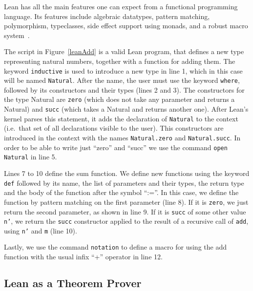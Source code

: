 Lean has all the main features one can expect from a functional programming language. Its features include algebraic datatypes, pattern matching, polymorphism, typeclasses, side effect support using monads, and a robust macro system~\cite{lean4_ref}.

The script in Figure~\ref{leanAdd} is a valid Lean program, that defines a new type representing natural numbers, together with a function for adding them.
The keyword \texttt{inductive} is used to introduce a new type in line 1, which in this case will be named \texttt{Natural}. After the name, the user must use the keyword \texttt{where}, followed by its constructors and their types (lines 2 and 3). The constructors for the type Natural are \texttt{zero} (which does not take any parameter and returns a Natural) and \texttt{succ} (which takes a Natural and returns another one).
After Lean's kernel parses this statement, it adds the declaration of \texttt{Natural}
to the context (i.e.\ that set of all declarations visible to the user).
This constructors are introduced in the context with the names \texttt{Natural.zero} and \texttt{Natural.succ}. In order to be able to write just ``zero'' and ``succ'' we use the command \texttt{open Natural} in line 5.

Lines 7 to 10 define the sum function. We define new functions using the keyword \texttt{def} followed by its name, the list of parameters and their types, the return type and the body of the function after the symbol ``:=''. In this case, we define the function by pattern matching on the first parameter (line 8). If it is \texttt{zero}, we just return the second parameter, as shown in line 9. If it is \texttt{succ} of some other value \texttt{n'}, we return the \texttt{succ} constructor applied to the result of a recursive call of \texttt{add}, using \texttt{n'} and \texttt{m} (line 10).

Lastly, we use the command \texttt{notation} to define a macro for using the add function with the usual infix ``+'' operator in line 12.



\subsection{Lean as a Theorem Prover}

